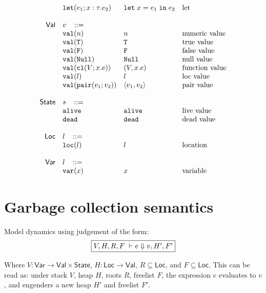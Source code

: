 \documentclass[11pt]{article}
\newcommand{\ms}[1]{\ensuremath{\mathsf{#1}}}
\newcommand{\irl}[1]{\mathtt{#1}}
\begin{document}
\[\begin{array}{r l l l l}
  & \irl{let}(e_1; x : \tau.e_2)			& \irl{let}\; x = e_1 \; \irl{in}\; e_2   	& \text{let}\\
  \\
\ms{Val}
        & v   \,\,\,\,\, ::= \\
 	& \irl{val}(n)                                			& n 												& \text{numeric value}\\
 	& \irl{val}(\irl{T})                               			& \irl{T} 								  & \text{true value}\\
 	& \irl{val}(\irl{F})                                			& \irl{F}								  & \text{false value}\\
 	& \irl{val}(\irl{Null})                                  & \irl{Null} 								  & \text{null value}\\
 	& \irl{val}(\irl{cl}(V; x.e))                & (V, x.e) 					& \text{function value}\\
 	& \irl{val}(l)                                			& l 								  & \text{loc value}\\
 	& \irl{val}(\pairexabt{v_1}{v_2})                             & \pairexcst{v_1}{v_2} 								  & \text{pair value}\\
  \\
\ms{State} & s   \,\,\,\,\, ::= \\
 	& \irl{alive}                                			& \irl{alive} 												& \text{live value}\\
 	& \irl{dead}                                			& \irl{dead} 												& \text{dead value}\\\\
\ms{Loc} & l   \,\,\,\,\, ::= \\
 	& \irl{loc}(l)                                			& l 												& \text{location}\\\\
\ms{Var} & l   \,\,\,\,\, ::= \\
 	& \irl{var}(x)                                			& x 												& \text{variable}\\
\end{array}
\]

\section{Garbage collection semantics}

Model dynamics using judgement of the form:
\[
\fbox{$V,H,R,F \; \vdash e \Downarrow v, H', F'$}
\]

\noindent
Where $V : \ms{Var} \to \ms{Val} \times \ms{State}$, $H : \ms{Loc} \to \ms{Val}$, $R \subseteq \ms{Loc}$, and $F \subseteq \ms{Loc}$. This can be read as: under stack $V$, heap $H$, roots $R$,
freelist $F$, the expression $e$ evaluates to $v$, and engenders a new heap $H'$ and freelist $F'$.\\
\end{document}
